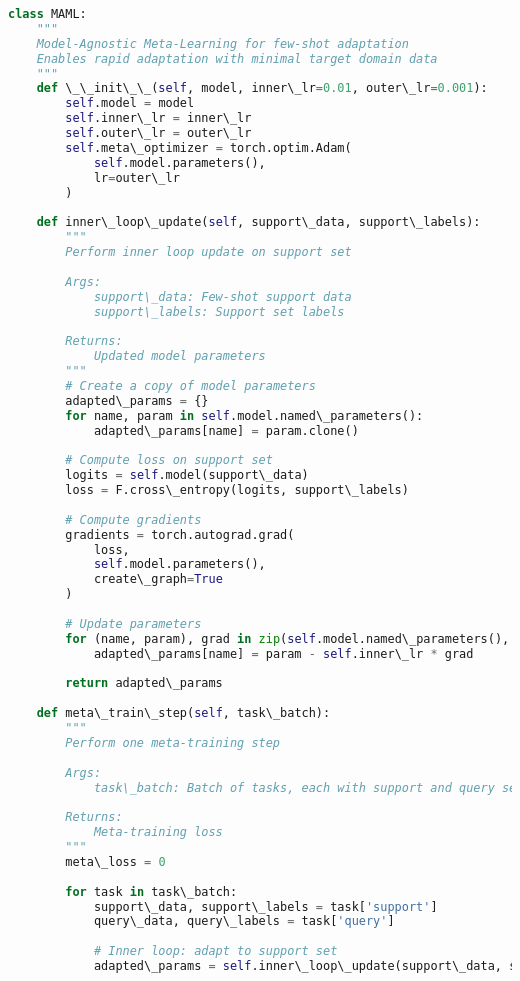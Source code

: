 \documentclass[journal]{IEEEtran}
\begin{document}
\begin{lstlisting}[language=Python, caption=MAML Implementation for Few-Shot Learning]
class MAML:
    """
    Model-Agnostic Meta-Learning for few-shot adaptation
    Enables rapid adaptation with minimal target domain data
    """
    def \_\_init\_\_(self, model, inner\_lr=0.01, outer\_lr=0.001):
        self.model = model
        self.inner\_lr = inner\_lr
        self.outer\_lr = outer\_lr
        self.meta\_optimizer = torch.optim.Adam(
            self.model.parameters(), 
            lr=outer\_lr
        )
        
    def inner\_loop\_update(self, support\_data, support\_labels):
        """
        Perform inner loop update on support set
        
        Args:
            support\_data: Few-shot support data
            support\_labels: Support set labels
        
        Returns:
            Updated model parameters
        """
        # Create a copy of model parameters
        adapted\_params = {}
        for name, param in self.model.named\_parameters():
            adapted\_params[name] = param.clone()
        
        # Compute loss on support set
        logits = self.model(support\_data)
        loss = F.cross\_entropy(logits, support\_labels)
        
        # Compute gradients
        gradients = torch.autograd.grad(
            loss, 
            self.model.parameters(),
            create\_graph=True
        )
        
        # Update parameters
        for (name, param), grad in zip(self.model.named\_parameters(), gradients):
            adapted\_params[name] = param - self.inner\_lr * grad
        
        return adapted\_params
    
    def meta\_train\_step(self, task\_batch):
        """
        Perform one meta-training step
        
        Args:
            task\_batch: Batch of tasks, each with support and query sets
        
        Returns:
            Meta-training loss
        """
        meta\_loss = 0
        
        for task in task\_batch:
            support\_data, support\_labels = task['support']
            query\_data, query\_labels = task['query']
            
            # Inner loop: adapt to support set
            adapted\_params = self.inner\_loop\_update(support\_data, support\_labels)
            

\end{lstlisting}
\end{document}
